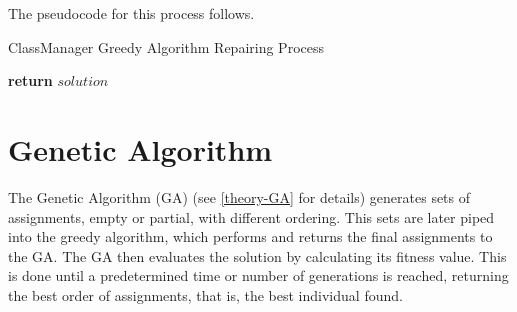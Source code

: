 The pseudocode for this process follows.

\begin{algorithm}[H]
    \caption{ClassManager Greedy Algorithm Repairing Process}
    \begin{algorithmic}[1]
                         
                    \EndIf
                         
                    \Else
                         
                    \EndIf
                \EndFor
            \EndFor
            \State \textbf{return} $solution$
        \EndProcedure
    \end{algorithmic}
\end{algorithm}



\section{Genetic Algorithm}

The Genetic Algorithm (GA) (see \ref{theory-GA} for details) generates sets of assignments, empty or partial, with different ordering. This sets are later piped into the greedy algorithm, which performs and returns the final assignments to the GA. The GA then evaluates the solution by calculating its fitness value. This is done until a predetermined time or number of generations is reached, returning the best order of assignments, that is, the best individual found.


